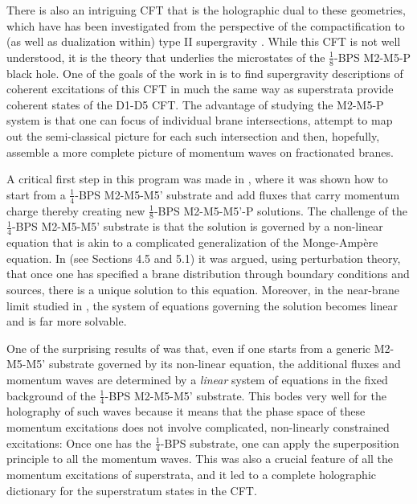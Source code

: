 \documentclass[11pt]{article}
\def\nBPS#1{$\frac{1}{#1}$-BPS}
\numberwithin{equation}{section}
\begin{document}
There is also an intriguing CFT that is the holographic dual to these geometries,  which have has been investigated from the perspective of the compactification to (as well as dualization within)  type II supergravity \cite{Boonstra:1998yu,Elitzur:1998mm,deBoer:1999gea,Gukov:2004ym,Tong:2014yna,Eberhardt:2017fsi,Eberhardt:2017pty,Eberhardt:2019niq,Witten:2024yod}.   While this CFT is not well understood, it is the theory that underlies the microstates of the \nBPS{8} M2-M5-P black hole.  One of the goals of the work in \cite{Bena:2022wpl,Bena:2022fzf,Bena:2023rzm,Bena:2024qed,Bena:2024dre,Bena:2025hxt} is to find supergravity descriptions of coherent excitations of this CFT in much the same way as superstrata provide coherent states of the D1-D5 CFT.  The advantage of studying the M2-M5-P system is that one can focus of individual brane intersections, attempt to map out the semi-classical picture for each such intersection and then, hopefully, assemble a more complete picture of momentum waves on fractionated branes.

A critical first step in this program was made in \cite{Bena:2024qed}, where it was shown how to start from a \nBPS{4}  M2-M5-M5' substrate and add  fluxes that carry momentum charge thereby creating new \nBPS{8} M2-M5-M5'-P solutions.  The challenge of the  \nBPS{4}  M2-M5-M5' substrate is that the solution is governed by a  non-linear equation that is akin to a complicated generalization of the Monge-Amp\`ere equation.  In \cite{Lunin:2007mj} (see Sections 4.5 and 5.1) it was argued, using perturbation theory, that once one has specified a  brane distribution through boundary conditions and sources, there is a unique solution to this equation.  Moreover, in the near-brane limit studied in \cite{Bachas:2013vza,Bena:2023rzm,Bena:2024dre,Bena:2025hxt}, the system of equations governing the solution becomes linear and is far more solvable.  

One of the surprising results of  \cite{Bena:2024qed} was that, even if one starts from a generic M2-M5-M5' substrate governed by its non-linear equation, the additional fluxes and momentum waves are determined by a {\it linear} system of equations in the fixed background of the \nBPS{4}  M2-M5-M5' substrate. This bodes very well for the holography of such waves because it means that the phase space of these momentum excitations does not involve complicated, non-linearly constrained excitations: Once one has the  \nBPS{4} substrate, one can apply the superposition principle to all the momentum waves.  This was also a crucial feature of all the momentum excitations of superstrata, and it led to a complete  holographic dictionary for the superstratum states in the CFT.
 
\end{document}
